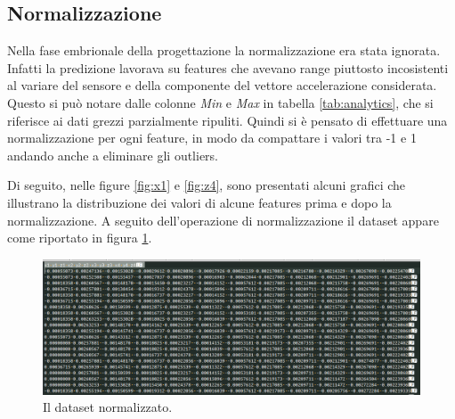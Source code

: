 \documentclass[12pt]{article}
\begin{document}
\subsection{Normalizzazione}
Nella fase embrionale della progettazione la normalizzazione era stata ignorata. Infatti la predizione lavorava su features che avevano range piuttosto incosistenti al variare del sensore e della componente del vettore accelerazione considerata. Questo si può notare dalle colonne \textit{Min} e \textit{Max} in tabella \ref{tab:analytics}, che si riferisce ai dati grezzi parzialmente ripuliti. Quindi si è pensato di effettuare una normalizzazione per ogni feature, in modo da compattare i valori tra -1 e 1 andando anche a eliminare gli outliers. \par
Di seguito, nelle figure \ref{fig:x1} e \ref{fig:z4}, sono presentati alcuni grafici che illustrano la distribuzione dei valori di alcune features prima e dopo la normalizzazione. A seguito dell'operazione di normalizzazione il dataset appare come riportato in figura \ref{fig:normalized}.

\begin{figure}[H]
	\includegraphics[width=1\textwidth]{images/datasetNormalizzato.PNG}
	\caption{Il dataset normalizzato.}
	\label{fig:normalized}
\end{figure}
\end{document}
